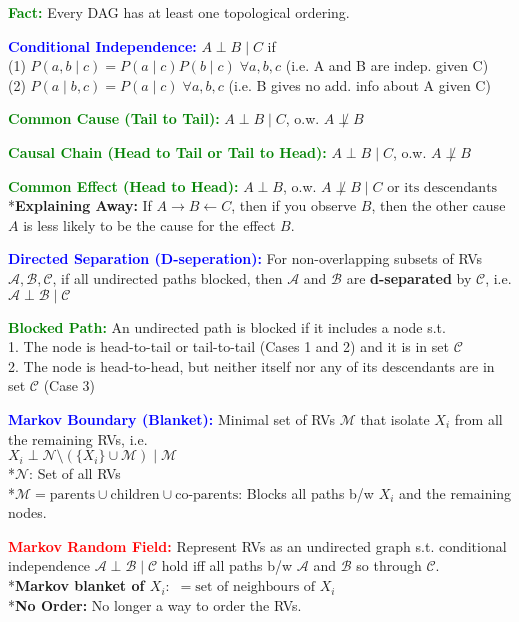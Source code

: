 \documentclass[5pt]{extarticle} %
\begin{document}
\begin{paracol}{3}
{    \textcolor{green}{\textbf{Fact:}} Every DAG has at least one topological ordering. 

    \textcolor{blue}{\textbf{Conditional Independence:}} $A \perp B \mid C$ if \\
    (1) $P(a,b \mid c) = P(a \mid c) P(b \mid c) \; \forall a,b,c$ (i.e. A and B are indep. given C) \\
    (2) $P(a \mid b,c) = P(a \mid c) \; \forall a,b,c$ (i.e. B gives no add. info about A given C)

    \textcolor{green}{\textbf{Common Cause (Tail to Tail):}} $A \perp B \mid C$, o.w. $A \not\perp B$ 

    \textcolor{green}{\textbf{Causal Chain (Head to Tail or Tail to Head):}} $A \perp B \mid C$, o.w. $A \not\perp B$

    \textcolor{green}{\textbf{Common Effect (Head to Head):}} $A \perp B$, o.w. $A \not\perp B \mid C \text{ or its descendants}$ \\
    *\textbf{Explaining Away:} If $A \rightarrow B \leftarrow C$, then if you observe $B$, then the other cause $A$ is less likely to be the cause for the effect $B$.

    \textcolor{blue}{\textbf{Directed Separation (D-seperation):}} For non-overlapping subsets of RVs $\mathcal{A}, \mathcal{B}, \mathcal{C}$, if all undirected paths blocked, then $\mathcal{A}$ and $\mathcal{B}$ are \textbf{d-separated} by $\mathcal{C}$, i.e. $\mathcal{A} \perp \mathcal{B} \mid \mathcal{C}$

    \textcolor{green}{\textbf{Blocked Path:}} An undirected path is blocked if it includes a node s.t. \\
    1. The node is head-to-tail or tail-to-tail (Cases 1 and 2) and it is in set $\mathcal{C}$ \\
    2. The node is head-to-head, but neither itself nor any of its descendants are in set $\mathcal{C}$ (Case 3)

    \textcolor{blue}{\textbf{Markov Boundary (Blanket):}} Minimal set of RVs $\mathcal{M}$ that isolate $X_i$ from all the remaining RVs, i.e. \\
    $X_i \perp \mathcal{N} \setminus (\{X_i\} \cup \mathcal{M}) \mid \mathcal{M}$ \\
    *$\mathcal{N}$: Set of all RVs \\
    *$\mathcal{M} = \text{parents} \cup \text{children} \cup \text{co-parents}$: Blocks all paths b/w $X_i$ and the remaining nodes.

    \textcolor{red}{\textbf{Markov Random Field:}} Represent RVs as an undirected graph s.t. conditional independence $\mathcal{A} \perp \mathcal{B} \mid \mathcal{C}$ hold iff all paths b/w $\mathcal{A}$ and $\mathcal{B}$ so through $\mathcal{C}$. \\
    *\textbf{Markov blanket of $X_i:$} $= \text{set of neighbours of } X_i$ \\
    *\textbf{No Order:} No longer a way to order the RVs.

}
\end{paracol}
\end{document}
